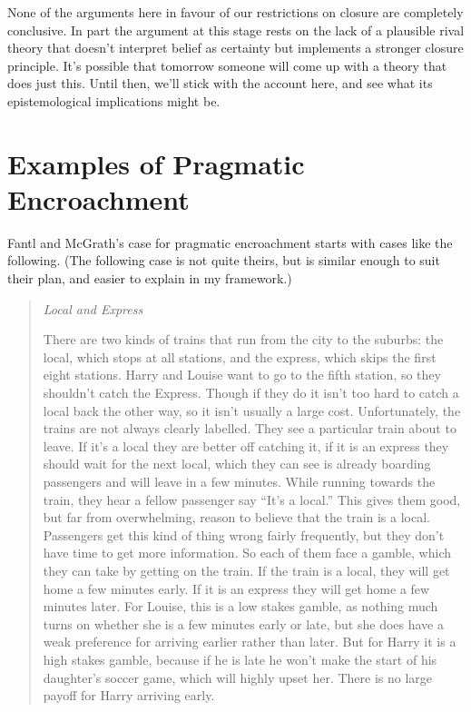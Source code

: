 None of the arguments here in favour of our restrictions on closure are completely conclusive. In part the argument at this stage rests on the lack of a plausible rival theory that doesn't interpret belief as certainty but implements a stronger closure principle. It's possible that tomorrow someone will come up with a theory that does just this. Until then, we'll stick with the account here, and see what its epistemological implications might be.

\section{Examples of Pragmatic Encroachment}

Fantl and McGrath's case for pragmatic encroachment starts with cases like the following. (The following case is not quite theirs, but is similar enough to suit their plan, and easier to explain in my framework.)

\begin{quote}
\textit{Local and Express}

\noindent There are two kinds of trains that run from the city to the suburbs: the local, which stops at all stations, and the express, which skips the first eight stations. Harry and Louise want to go to the fifth station, so they shouldn't catch the Express. Though if they do it isn't too hard to catch a local back the other way, so it isn't usually a large cost. Unfortunately, the trains are not always clearly labelled. They see a particular train about to leave. If it's a local they are better off catching it, if it is an express they should wait for the next local, which they can see is already boarding passengers and will leave in a few minutes. While running towards the train, they hear a fellow passenger say ``It's a local.'' This gives them good, but far from overwhelming, reason to believe that the train is a local. Passengers get this kind of thing wrong fairly frequently, but they don't have time to get more information. So each of them face a gamble, which they can take by getting on the train. If the train is a local, they will get home a few minutes early. If it is an express they will get home a few minutes later. For Louise, this is a low stakes gamble, as nothing much turns on whether she is a few minutes early or late, but she does have a weak preference for arriving earlier rather than later. But for Harry it is a high stakes gamble, because if he is late he won't make the start of his daughter's soccer game, which will highly upset her. There is no large payoff for Harry arriving early. 
\end{quote}

